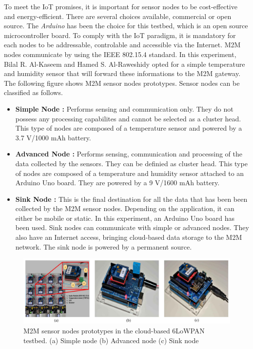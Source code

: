 \documentclass[10pt,journal,compsoc]{IEEEtran}
\begin{document}
To meet the IoT promises, it is important for sensor nodes to be 
cost-effective and energy-efficient. There are several choices available, 
commercial or open source. The \textit{Arduino} has been the choice 
for this testbed, which is an open source microcontroller board. 
To comply with the IoT paradigm, it is mandatory for each nodes to be 
addressable, controlable and accessible via the Internet. M2M nodes 
communicate by using the IEEE 802.15.4 standard. In this 
experiment, Bilal R. Al-Kaseem and Hamed S. Al-Raweshidy opted for 
a simple temperature and humidity sensor that will forward these 
informations to the M2M gateway. The following figure shows M2M sensor 
nodes prototypes. Sensor nodes can be classified as follows.
\begin{itemize}
    \item \textbf{Simple Node :} Performs sensing and communication only. 
    They do not possess any processing capabilites and cannot be 
    selected as a cluster head. This type of nodes are composed of a 
    temperature sensor and powered by a 3.7 V/1000 mAh battery. 
    \item \textbf{Advanced Node :} Performs sensing, communication and 
    processing of the data collected by the sensors. They can be 
    definied as cluster head. This type of nodes are composed of a 
    temperature and humidity sensor attached to an Arduino Uno board. 
    They are powered by a 9 V/1600 mAh battery.
    \item \textbf{Sink Node :} This is the final destination for all the 
    data that has been been collected by the M2M sensor nodes. Depending 
    on the application, it can either be mobile or static. In this 
    experiment, an Arduino Uno board has been used. Sink nodes can 
    communicate with simple or advanced nodes. They also have an 
    Internet access, bringing cloud-based data storage to the M2M 
    network. The sink node is powered by a permanent source.
\end{itemize}

\begin{figure}
    \includegraphics[width=\textwidth]{m2mnodes}
    \caption{M2M sensor nodes prototypes in the cloud-based 6LoWPAN 
    testbed. (a) Simple node (b) Advanced node (c) Sink node}
\end{figure}
\end{document}
